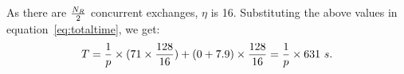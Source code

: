 \documentclass{rspublic}
\newcommand{\alnote}[1]{ {\textcolor{blue} { ***andre: #1 }}}
\newcommand{\athotanote}[1]{ {\textcolor{green} { ***athota: #1 }}}
\newcommand{\alnote}[1]{}
\newcommand{\athotanote}[1]{}
\begin{document}






As there are $N_R \over 2$ concurrent exchanges, $\eta$ is 16. Substituting the above
values in equation~\ref{eq:totaltime}, we get:
\begin{eqnarray}
T=  {1 \over p} \times {{(71\times {128\over 16}}) + {(0+7.9)\times {128\over 16}}} = {1 \over p} \times 631~s.
\label{eq:decent}
\end{eqnarray}

\end{document}
